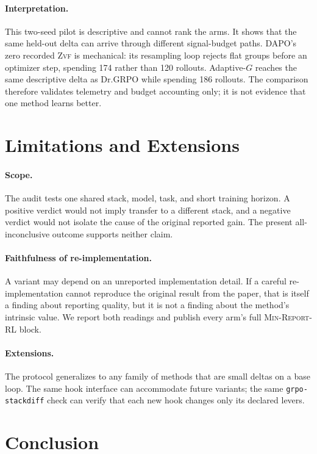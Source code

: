 \documentclass[11pt]{article}
\newcommand{\zvf}{\textsc{Zvf}}
\newcommand{\minreport}{\textsc{Min-Report-RL}}
\newcommand{\grpo}{\textsc{GRPO}}
\begin{document}
\paragraph{Interpretation.} This two-seed pilot is descriptive and cannot rank
the arms. It shows that the same held-out delta can arrive through different
signal-budget paths. DAPO's zero recorded \zvf{} is mechanical: its resampling
loop rejects flat groups before an optimizer step, spending 174 rather than 120
rollouts. Adaptive-$G$ reaches the same descriptive delta as Dr.\grpo{} while
spending 186 rollouts. The comparison therefore validates telemetry and budget
accounting only; it is not evidence that one method learns better.

\section{Limitations and Extensions}


\paragraph{Scope.} The audit tests one shared stack, model, task, and short
training horizon. A positive verdict would not imply transfer to a different
stack, and a negative verdict would not isolate the cause of the original
reported gain. The present all-inconclusive outcome supports neither claim.

\paragraph{Faithfulness of re-implementation.} A variant may depend on an
unreported implementation detail. If a careful re-implementation cannot
reproduce the original result from the paper, that is itself a finding about
reporting quality, but it is not a finding about the method's intrinsic value.
We report both readings and publish every arm's full \minreport{} block.

\paragraph{Extensions.} The protocol generalizes to any family of methods that
are small deltas on a base loop. The same hook interface can accommodate
future variants; the same \texttt{grpo-stackdiff} check can verify that each
new hook changes only its declared levers.

\section{Conclusion}
\end{document}
